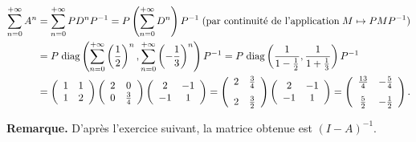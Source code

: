 {{\begin{align*}\ensuremath
\sum_{n=0}^{+\infty}A^n&=\sum_{n=0}^{+\infty}PD^nP^{-1}=P\left(\sum_{n=0}^{+\infty}D^n\right)P^{-1}\;(\text{par continuité de l'application}\;M\mapsto PMP^{-1})\\
  &=P\;\text{diag}\left(\sum_{n=0}^{+\infty}\left( \frac{1}{2}\right)^n,\sum_{n=0}^{+\infty}\left(- \frac{1}{3}\right)^n\right)P^{-1}=P\;\text{diag}\left( \frac{1}{1- \frac{1}{2}}, \frac{1}{1+ \frac{1}{3}}\right)P^{-1}\\
  &=\left(
\begin{array}{cc}
1&1\\
1&2
\end{array}
\right)\left(
\begin{array}{cc}
2&0\\
0& \frac{3}{4}
\end{array}
\right)\left(
\begin{array}{cc}
2&-1\\
-1&1
\end{array}
\right)=\left(
\begin{array}{cc}
\rule[-4mm]{0mm}{0mm}2& \frac{3}{4}\\
2& \frac{3}{2}
\end{array}
\right)\left(
\begin{array}{cc}
2&-1\\
-1&1
\end{array}
\right)=\left(
\begin{array}{cc}
\rule[-4mm]{0mm}{0mm} \frac{13}{4}&- \frac{5}{4}\\
 \frac{5}{2}&- \frac{1}{2}
\end{array}
\right).
\end{align*}

\begin{center}
\end{center}

\textbf{Remarque.} D'après l'exercice suivant, la matrice obtenue est $(I-A)^{-1}$.
}
}
